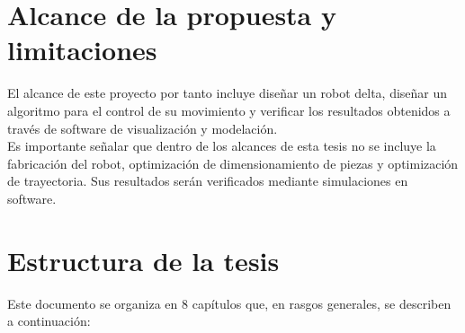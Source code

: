 \section{Alcance de la propuesta y limitaciones}
El alcance de este proyecto por tanto incluye diseñar un robot delta, diseñar un algoritmo para el control de su movimiento y verificar los resultados obtenidos a través de software de visualización y modelación.\\ 
Es importante señalar que dentro de los alcances de esta tesis no se incluye la fabricación del robot, optimización de dimensionamiento de piezas y  optimización de trayectoria. Sus resultados serán verificados mediante simulaciones en software.


\section{Estructura de la tesis}

Este documento se organiza en 8 capítulos que, en rasgos generales, se describen a continuación:

